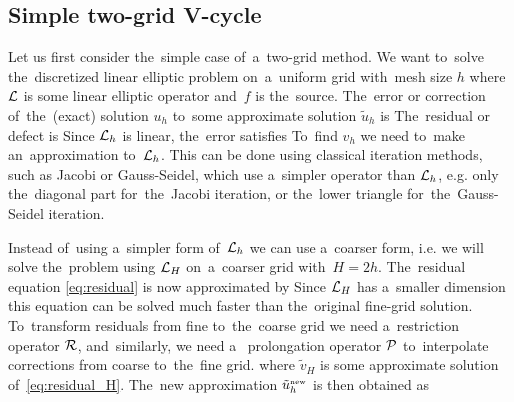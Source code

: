 \subsection{Simple two-grid V-cycle}
Let us first consider the~simple case of~a~two-grid method. We want to~solve the~discretized linear elliptic problem on~a~uniform grid with~mesh size $h$
where $\mathcal{L}$ is some linear elliptic operator and~$f$ is the~source. The~error or correction of~the~(exact) solution $u_h$ to~some approximate solution $\tilde u_h$ is
The~residual or defect is
Since $\mathcal{L}_h$ is linear, the~error satisfies
To~find $v_h$ we need to~make an~approximation to~$\mathcal{L}_h$. This can be done using classical iteration methods, such as Jacobi or Gauss-Seidel, which use a~simpler operator than $\mathcal{L}_h$, e.g. only the~diagonal part for~the~Jacobi iteration, or the~lower triangle for~the~Gauss-Seidel iteration.

Instead of~using a~simpler form of~$\mathcal{L}_h$ we can use a~coarser form, i.e. we will solve the~problem using $\mathcal{L}_H$ on~a~coarser grid with~$H=2h$. The~residual equation \eqref{eq:residual} is now approximated by
Since $\mathcal{L}_H$ has a~smaller dimension this equation can be solved much faster than the~original fine-grid solution. To~transform residuals from fine to~the~coarse grid we need a~restriction operator $\mathcal{R}$, and~similarly, we need a~ prolongation operator $\mathcal{P}$ to~interpolate corrections from coarse to~the~fine grid.
where $\tilde v_H$ is some approximate solution of~\eqref{eq:residual_H}. The~new approximation $\tilde u_h^\text{\tiny new}$ is then obtained as


